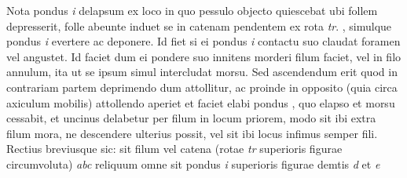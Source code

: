 
\pstart  Nota pondus \textit{i} delapsum ex loco in quo pessulo objecto quiescebat ubi follem depresserit, folle abeunte induet se in catenam \protect{} pendentem ex rota \textit{tr}. , simulque pondus \textit{i} evertere ac deponere. Id fiet si ei pondus \textit{i} contactu suo claudat foramen vel angustet. Id faciet dum ei pondere suo innitens morderi filum faciet, vel in filo annulum, ita ut se ipsum simul intercludat morsu. Sed  ascendendum erit quod  in contrariam partem  deprimendo dum attollitur, ac proinde in opposito (quia circa axiculum mobilis) attollendo aperiet et faciet elabi pondus , quo elapso et morsu cessabit, et uncinus delabetur per filum in locum priorem, modo sit ibi extra filum mora, ne descendere ulterius possit, vel sit ibi locus infimus semper fili. 
\pend 
\pstart  Rectius breviusque sic: sit filum vel catena\protect{} (rotae \textit{tr} superioris figurae circumvoluta) \textit{abc} reliquum omne sit pondus \textit{i} superioris figurae demtis \textit{d} et \textit{e}
